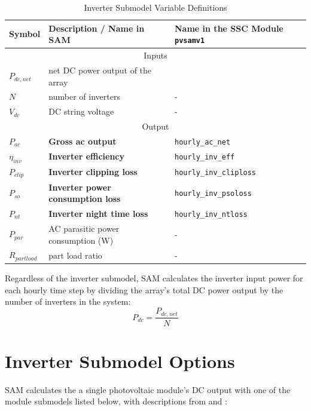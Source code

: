 \documentclass[12pt,letterpaper]{article}
\begin{document}
\begin{table}
\begin{center}
\caption{Inverter Submodel Variable Definitions}
\begin{tabular}{lll}
\midrule
Symbol & Description / \textbf{Name in SAM} & Name in the SSC Module \texttt{pvsamv1}\\
\midrule
\multicolumn{3}{c}{Inputs}\\
$P_{dc,net}$ & net DC power output of the array & \\
$N$ & number of inverters & - \\
$V_{dc}$ & DC string voltage & - \\
\midrule
\multicolumn{3}{c}{Output}\\
$P_{ac}$ & \textbf{Gross ac output} & \texttt{hourly\_ac\_net} \\
$\eta_{inv}$ & \textbf{Inverter efficiency} & \texttt{hourly\_inv\_eff}  \\
$P_{clip}$ & \textbf{Inverter clipping loss} & \texttt{hourly\_inv\_cliploss}  \\
$P_{so}$ & \textbf{Inverter power consumption loss}& \texttt{hourly\_inv\_psoloss}  \\
$P_{nt}$ & \textbf{Inverter night time loss}& \texttt{hourly\_inv\_ntloss}  \\
$P_{par}$ & AC parasitic power consumption (W) & - \\%
$R_{partload}$ & part load ratio & - \\
\midrule
\end{tabular}
\label{tab-invertervars}
\end{center}
\end{table}

Regardless of the inverter submodel, SAM calculates the inverter input power for each hourly time step by dividing the array's total DC power output by the number of inverters in the system:
\begin{equation}\label{eqn-invinputpower}
P_{dc} = \frac{P_{dc,net}}{N}
\end{equation}

\section{Inverter Submodel Options}\label{sec-inverteroptions}

SAM calculates the a single photovoltaic module's DC output with one of the module submodels listed below, with descriptions from \citet{help-module} and \citet{blair2013}:
\end{document}

